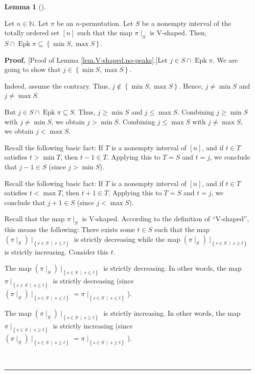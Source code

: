 \documentclass[numbers=enddot,12pt,final,onecolumn,notitlepage]{scrartcl}%
\theoremstyle{definition}
\newtheorem{lem}[theo]{Lemma}
\newenvironment{lemma}[1][]
{\begin{lem}[#1]\begin{leftbar}}
{\end{leftbar}\end{lem}}
\newenvironment{proof}[1][Proof]{\noindent\textbf{#1.} }{\ \rule{0.5em}{0.5em}}
\newenvironment{verlong}{}{}
\begin{document}
\begin{verlong}
\begin{lemma}
\label{lem.V-shaped.no-peaks}Let $n\in\mathbb{N}$. Let $\pi$ be an
$n$-permutation. Let $S$ be a nonempty interval of the totally ordered set
$\left[  n\right]  $ such that the map $\pi\mid_{S}$ is V-shaped. Then,
$S\cap\operatorname{Epk}\pi\subseteq\left\{  \min S,\max S\right\}  $.
\end{lemma}

\begin{proof}
[Proof of Lemma \ref{lem.V-shaped.no-peaks}.]Let $j\in S\cap
\operatorname{Epk}\pi$. We are going to show that $j\in\left\{  \min S,\max
S\right\}  $.

Indeed, assume the contrary. Thus, $j\notin\left\{  \min S,\max S\right\}  $.
Hence, $j\neq\min S$ and $j\neq\max S$.

But $j\in S\cap\operatorname{Epk}\pi\subseteq S$. Thus, $j\geq\min S$ and
$j\leq\max S$. Combining $j\geq\min S$ with $j\neq\min S$, we obtain $j>\min
S$. Combining $j\leq\max S$ with $j\neq\max S$, we obtain $j<\max S$.

Recall the following basic fact: If $T$ is a nonempty interval of $\left[
n\right]  $, and if $t\in T$ satisfies $t>\min T$, then $t-1\in T$. Applying
this to $T=S$ and $t=j$, we conclude that $j-1\in S$ (since $j>\min S$).

Recall the following basic fact: If $T$ is a nonempty interval of $\left[
n\right]  $, and if $t\in T$ satisfies $t<\max T$, then $t+1\in T$. Applying
this to $T=S$ and $t=j$, we conclude that $j+1\in S$ (since $j<\max S$).

Recall that the map $\pi\mid_{S}$ is V-shaped. According to the definition of
\textquotedblleft V-shaped\textquotedblright, this means the following: There
exists some $t\in S$ such that the map $\left(  \pi\mid_{S}\right)
\mid_{\left\{  s\in S\ \mid\ s\leq t\right\}  }$ is strictly decreasing while
the map $\left(  \pi\mid_{S}\right)  \mid_{\left\{  s\in S\ \mid\ s\geq
t\right\}  }$ is strictly increasing. Consider this $t$.

The map $\left(  \pi\mid_{S}\right)  \mid_{\left\{  s\in S\ \mid\ s\leq
t\right\}  }$ is strictly decreasing. In other words, the map $\pi
\mid_{\left\{  s\in S\ \mid\ s\leq t\right\}  }$ is strictly decreasing (since
$\left(  \pi\mid_{S}\right)  \mid_{\left\{  s\in S\ \mid\ s\leq t\right\}
}=\pi\mid_{\left\{  s\in S\ \mid\ s\leq t\right\}  }$).

The map $\left(  \pi\mid_{S}\right)  \mid_{\left\{  s\in S\ \mid\ s\geq
t\right\}  }$ is strictly increasing. In other words, the map $\pi
\mid_{\left\{  s\in S\ \mid\ s\geq t\right\}  }$ is strictly increasing (since
$\left(  \pi\mid_{S}\right)  \mid_{\left\{  s\in S\ \mid\ s\geq t\right\}
}=\pi\mid_{\left\{  s\in S\ \mid\ s\geq t\right\}  }$).


\end{proof}
\end{verlong}
\end{document}
